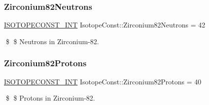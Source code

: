 \subsubsection{\texorpdfstring{Zirconium82\+Neutrons}{Zirconium82Neutrons}}
{\footnotesize\ttfamily \mbox{\hyperlink{group___isotope_const-_macros_ga5f18360b3e99483a35c32d789e62621c}{I\+S\+O\+T\+O\+P\+E\+C\+O\+N\+S\+T\+\_\+\+I\+NT}} Isotope\+Const\+::\+Zirconium82\+Neutrons = 42}

\$ \$ Neutrons in Zirconium-\/82. \mbox{\label{group___isotope_const-_zirconium-_zr82_gaccf54cb4b7c7adba0b402fc32cda4448}} 
\subsubsection{\texorpdfstring{Zirconium82\+Protons}{Zirconium82Protons}}
{\footnotesize\ttfamily \mbox{\hyperlink{group___isotope_const-_macros_ga5f18360b3e99483a35c32d789e62621c}{I\+S\+O\+T\+O\+P\+E\+C\+O\+N\+S\+T\+\_\+\+I\+NT}} Isotope\+Const\+::\+Zirconium82\+Protons = 40}

\$ \$ Protons in Zirconium-\/82. 